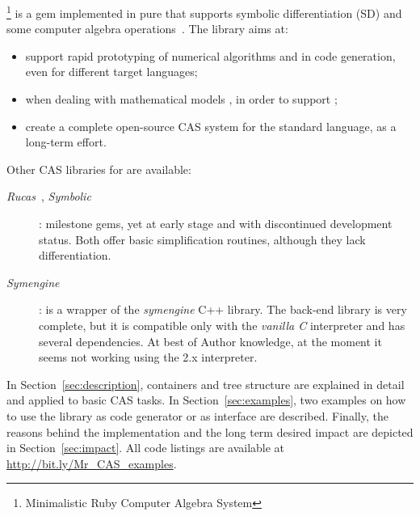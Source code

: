 \ragnicas\footnote{Minimalistic Ruby Computer Algebra System} is a gem implemented in pure \Ruby that supports symbolic differentiation (SD) and some computer algebra operations~\cite{von2013modern}. The library aims at:
\begin{itemize}
  \item support  rapid prototyping of numerical algorithms and in code generation, even for different target languages;
  \item when dealing with  mathematical models , in order to support ;
  \item create a complete open-source CAS system for the standard \Ruby language, as a long-term effort.
\end{itemize}

Other CAS libraries for \Ruby are available:
\begin{description}
  \item [\emph{Rucas}~\cite{rucas}, \emph{Symbolic}~\cite{symbolic}]: milestone gems, yet at early stage and with discontinued development status. Both offer basic simplification routines, although they lack differentiation.
  \item [\emph{Symengine}~\cite{symengine}]: is a wrapper of the \emph{symengine} C++ library. The back-end library is very complete, but it is compatible only with the \emph{vanilla C} \Ruby interpreter and has several dependencies.
  At best of Author knowledge, at the moment it seems not working using the \Ruby 2.x interpreter.
\end{description}

In Section~\ref{sec:description}, \ragnicas containers and tree structure are explained in detail and applied to basic CAS tasks. In Section~\ref{sec:examples}, two examples on how to use the library as code generator or as interface are described. Finally, the reasons behind the implementation and the long term desired impact are depicted in Section~\ref{sec:impact}. All code listings are available at \url{http://bit.ly/Mr_CAS_examples}.
